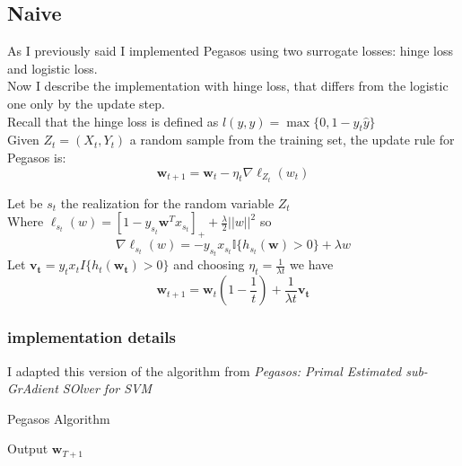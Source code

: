 \subsection{Naive}
As I previously said I implemented Pegasos using two surrogate losses: hinge loss and logistic loss.\\
Now I describe the implementation with hinge loss, that differs from the logistic one only by the update step.\\ 
Recall that the hinge loss is defined as $l(y, \hat{y}) = \max\{0, 1 - y_t \hat{y}\}$\\
Given $Z_t = (X_t, Y_t)$ a random sample from the training set, the update rule for Pegasos is:\\
$$\boldsymbol{w}_{t+1} = \boldsymbol{w}_t - \eta_t \nabla\ell_{Z_t}(w_t)$$

Let be $s_t$ the realization for the random variable $Z_t$\\ 
Where $\ell_{s_t}(w) = \left[1 - y_{s_t} \boldsymbol{w}^T x_{s_t}\right]_+ + \frac{\lambda}{2} ||w||^2$ so
$$\nabla\ell_{s_t}(w) = -y_{s_t} x_{s_t} \mathbb{I}\{h_{s_t}(\boldsymbol{w}) > 0\} + \lambda w $$
Let $\boldsymbol{v_t} = y_t x_t I\{h_t(\boldsymbol{w_t}) > 0\}$ and choosing $\eta_t = \frac{1}{\lambda t}$ we have
$$\boldsymbol{w}_{t+1} = \boldsymbol{w}_t (1 - \frac{1}{t}) + \frac{1}{\lambda t} \boldsymbol{v_t}$$

\subsubsection{implementation details}
I adapted this version of the algorithm from \textit{Pegasos: Primal Estimated sub-GrAdient SOlver for SVM}\cite{Pegasos_paper}\\

\begin{algorithm}[H]
    \SetAlgoLined
    \DontPrintSemicolon
    \caption{Pegasos Algorithm}
    Output $\boldsymbol{w}_{T+1}$
\end{algorithm}

